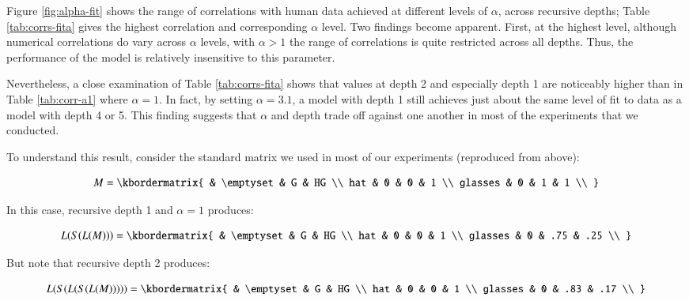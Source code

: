 \documentclass[man,noapacite]{apa2}
\begin{document}
Figure \ref{fig:alpha-fit} shows the range of correlations with human data achieved at different levels of $\alpha$, across recursive depths; Table \ref{tab:corrs-fita} gives the highest correlation and corresponding $\alpha$ level. Two findings become apparent. First, at the highest level, although numerical correlations do vary across $\alpha$ levels, with $\alpha > 1$ the range of correlations is quite restricted across all depths. Thus, the performance of the model is relatively insensitive to this parameter.

Nevertheless, a close examination of Table \ref{tab:corrs-fita} shows that values at depth 2 and especially depth 1 are noticeably higher than in Table \ref{tab:corr-a1} where $\alpha=1$. In fact, by setting $\alpha=3.1$, a model with depth 1 still achieves just about the same level of fit to data as a model with depth 4 or 5. This finding suggests that $\alpha$ and depth trade off against one another in most of the experiments that we conducted.

To understand this result, consider the standard matrix we used in most of our experiments (reproduced from above):

\begin{equation}
      M = \kbordermatrix{
                 & \emptyset & G & HG \\
        hat      & 0  & 0  & 1  \\
        glasses  & 0  & 1  & 1 \\
      }
\end{equation}

\noindent In this case, recursive depth 1 and $\alpha=1$ produces:

\begin{equation}
      L(S(L(M))) = \kbordermatrix{
                 & \emptyset & G & HG \\
        hat      & 0  & 0  & 1  \\
        glasses  & 0  & .75  & .25 \\
      }
\end{equation}



\noindent But note that recursive depth 2 produces:

\begin{equation}
  L(S(L(S(L(M))))) = \kbordermatrix{
             & \emptyset & G & HG \\
    hat      & 0  & 0  & 1  \\
    glasses  & 0  & .83  & .17 \\
  }
\end{equation}
\end{document}
